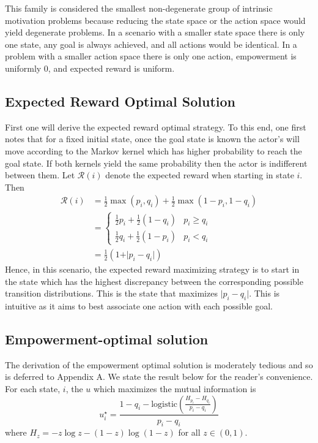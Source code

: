 \documentclass{article}
\newcommand{\Rr}{\mathcal{R}}
\begin{document}
This family is considered the smallest non-degenerate group of intrinsic motivation problems because reducing the state space or the action space would yield degenerate problems. In a scenario with a smaller state space there is only one state, any goal is always achieved, and all actions would be identical. In a problem with a smaller action space there is only one action, empowerment is uniformly $0$, and expected reward is uniform. 

\subsection{Expected Reward Optimal Solution}
First one will derive the expected reward optimal strategy. To this end, one first notes that for a fixed initial state, once the goal state is known the actor's will move according to the Markov kernel which has higher probability to reach the goal state. If both kernels yield the same probability then the actor is indifferent between them. Let $\Rr(i)$ denote the expected reward when starting in state $i$. Then
\begin{align*}
\Rr(i) 
	&= \frac{1}{2} \max(p_i,q_i) +\frac{1}{2} \max(1-p_i,1-q_i)\\
	&=\begin{cases}
		\frac{1}{2} p_i +\frac{1}{2} (1-q_i) & p_i\geq q_i\\
		\frac{1}{2} q_i +\frac{1}{2} (1-p_i) & p_i < q_i
		\end{cases}\\
	&=\frac{1}{2}(1+\vert p_i - q_i \vert) 	
\end{align*}
Hence, in this scenario, the expected reward maximizing strategy is to start in the state which has the highest discrepancy between the corresponding possible transition distributions. This is the state that maximizes $\vert p_i-q_i\vert$. This is intuitive as it aims to best associate one action with  each possible goal. 

\subsection{Empowerment-optimal solution}
The derivation of the empowerment optimal solution is moderately tedious and so is deferred to Appendix A. We state the result below for the reader's convenience. For each state, $i$, the $u$ which maximizes the mutual information is 
\[u^\star_i=\frac{1-q_i-\text{logistic}\left(\frac{H_{p_i}-H_{q_i}}{p_i-q_i}\right)}{p_i-q_i} \]
where $H_z=-z\log z - (1-z)\log(1-z)$ for all $z\in (0,1)$. 
\end{document}
